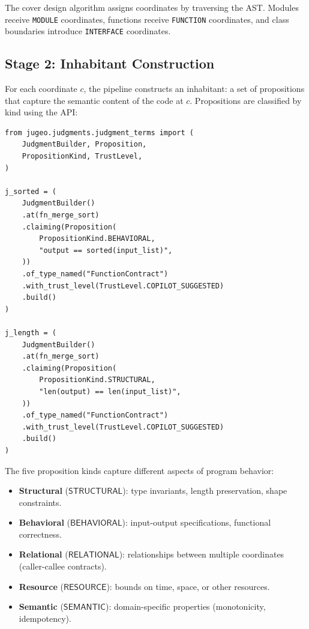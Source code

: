 \documentclass[11pt]{article}
\begin{document}
The cover design algorithm assigns coordinates by traversing the
AST.  Modules receive \texttt{MODULE} coordinates, functions receive
\texttt{FUNCTION} coordinates, and class boundaries introduce
\texttt{INTERFACE} coordinates.

\subsection{Stage 2: Inhabitant Construction}\label{ssec:inhabitant}

For each coordinate $c$, the pipeline constructs an inhabitant:
a set of propositions that capture the semantic content of the
code at $c$.  Propositions are classified by kind using the
\JuGeo{} API:

\begin{lstlisting}[style=jugeo-python,caption={Proposition construction via the JuGeo API.}]
from jugeo.judgments.judgment_terms import (
    JudgmentBuilder, Proposition,
    PropositionKind, TrustLevel,
)

j_sorted = (
    JudgmentBuilder()
    .at(fn_merge_sort)
    .claiming(Proposition(
        PropositionKind.BEHAVIORAL,
        "output == sorted(input_list)",
    ))
    .of_type_named("FunctionContract")
    .with_trust_level(TrustLevel.COPILOT_SUGGESTED)
    .build()
)

j_length = (
    JudgmentBuilder()
    .at(fn_merge_sort)
    .claiming(Proposition(
        PropositionKind.STRUCTURAL,
        "len(output) == len(input_list)",
    ))
    .of_type_named("FunctionContract")
    .with_trust_level(TrustLevel.COPILOT_SUGGESTED)
    .build()
)
\end{lstlisting}

The five proposition kinds capture different aspects of program
behavior:
\begin{itemize}
  \item \textbf{Structural} ($\mathsf{STRUCTURAL}$): type invariants,
    length preservation, shape constraints.
  \item \textbf{Behavioral} ($\mathsf{BEHAVIORAL}$): input-output
    specifications, functional correctness.
  \item \textbf{Relational} ($\mathsf{RELATIONAL}$): relationships
    between multiple coordinates (\eg caller-callee contracts).
  \item \textbf{Resource} ($\mathsf{RESOURCE}$): bounds on time,
    space, or other resources.
  \item \textbf{Semantic} ($\mathsf{SEMANTIC}$): domain-specific
    properties (\eg monotonicity, idempotency).
\end{itemize}
\end{document}
